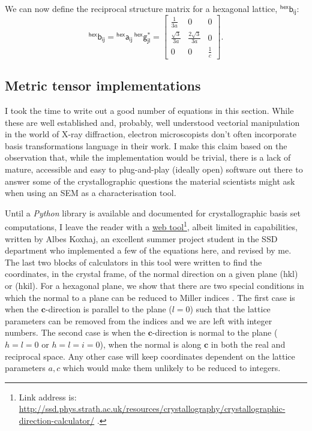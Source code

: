 We can now define the reciprocal structure matrix for a hexagonal lattice, $\mathsf{^{hex}b_{ij}}$:
\begin{equation}
\mathsf{^{hex}b_{ij}} = \mathsf{^{hex}a_{ij}} \, \mathsf{^{hex}g^*_{jl}} = \begin{bmatrix}
\frac{1}{3a} & 0 & 0 \\[0.3em]
\frac{\sqrt{3}}{3a} & \frac{2\sqrt{3}}{3a} & 0 \\[0.3em]
0 & 0 & \frac{1}{c}
\end{bmatrix}.
\end{equation}

\subsection{Metric tensor implementations}
I took the time to write out a good number of equations in this section. While these are well established and, probably, well  understood vectorial manipulation in the world of X-ray diffraction, electron microscopists don't often incorporate basis transformations language in their work. I make this claim based on the observation that, while the implementation would be trivial, there is a lack of mature, accessible and easy to plug-and-play (ideally open) software out there to answer some of the crystallographic questions the material scientists might ask when using an SEM as a characterisation tool. 

Until a \textit{Python} library is available and documented for crystallographic basis set computations, I leave the reader with a \href{http://ssd.phys.strath.ac.uk/resources/crystallography/crystallographic-direction-calculator/}{web tool}\footnote{ Link address is: \href{http://ssd.phys.strath.ac.uk/resources/crystallography/crystallographic-direction-calculator/}{http://ssd.phys.strath.ac.uk/resources/crystallography/crystallographic-direction-calculator/} .}, albeit limited in capabilities, written by Albes Koxhaj, an excellent summer project student in the SSD department who implemented a few of the equations here, and revised by me. The last two blocks of calculators in this tool were written to find the coordinates, in the crystal frame, of the normal direction on a given plane \hkl(hkl) or \hkl(hkil). For a hexagonal plane, we show that there are two special conditions in which the normal to a plane can be reduced to Miller indices \hkl[uvw]. The first case is when the $\mathbf{c}$-direction is parallel to the plane ($l=0$) such that the lattice parameters can be removed from the indices and we are left with integer numbers. The second case is when the $\mathbf{c}$-direction is normal to the plane ($h=l=0$ or $h=l=i=0$), when the normal is along $\mathbf{c}$ in both the real and reciprocal space. Any other case will keep coordinates dependent on the lattice parameters $a, c$ which would make them unlikely to be reduced to integers. 

